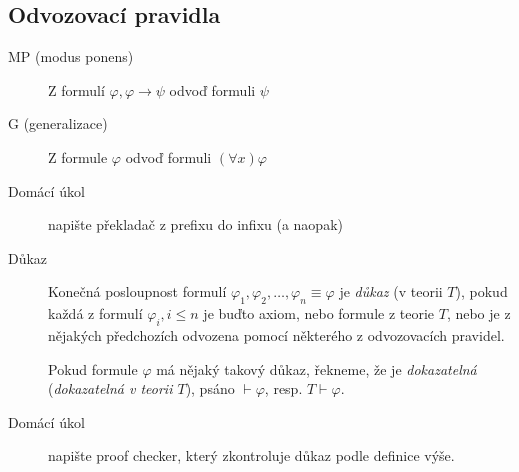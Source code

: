 \documentclass[a4paper]{article}
\begin{document}
	\subsection{Odvozovací pravidla}
	\begin{description}
		\item[MP (modus ponens)] Z formulí $\varphi, \varphi \to \psi$ odvoď formuli $\psi$
		\item[G (generalizace)] Z formule $\varphi$ odvoď formuli $(\forall x) \varphi$
	\end{description}

	
	\begin{description}
		\item[Domácí úkol] napište překladač z prefixu do infixu (a naopak)

		\item[Důkaz] Konečná posloupnost formulí $\varphi_1, \varphi_2, \ldots, \varphi_n \equiv \varphi$ je
			\textit{důkaz} (v teorii $T$), pokud každá z formulí $\varphi_i, i \le n$ je buďto
			axiom, nebo formule z teorie $T$, nebo je z nějakých předchozích odvozena pomocí některého
			z odvozovacích pravidel.

			Pokud formule $\varphi$ má nějaký takový důkaz, řekneme, že je \textit{dokazatelná}
			(\textit{dokazatelná v teorii $T$}), psáno $\vdash \varphi$, resp. $T \vdash \varphi$.

		\item[Domácí úkol] napište proof checker, který zkontroluje důkaz podle
			definice výše.


\end{description}
\end{document}
